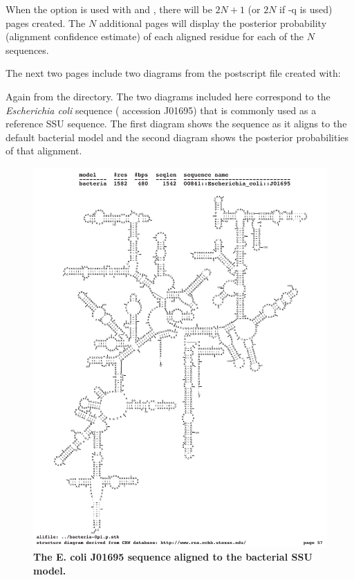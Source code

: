 When the  option is used with  and
, there will be $2N+1$ (or $2N$ if {\prog -q} is used)
pages created. The $N$ additional pages will display the posterior
probability (alignment confidence estimate) of each aligned residue
for each of the $N$ sequences.

The next two pages include two diagrams from the postscript file 
 created with:


Again from the  directory.
The two diagrams included here correspond to the
\emph{Escherichia coli} sequence ( accession J01695) that
is commonly used as a reference SSU sequence. The first diagram shows
the sequence as it aligns to the default bacterial model and the
second diagram shows the posterior probabilities of that alignment.

\begin{figure}
\begin{center}
\includegraphics[width=5.7in]{Figures/ecoli-seq}
\end{center}
\caption{\textbf{The E. coli J01695 sequence aligned to the bacterial
SSU model.}}
\label{fig:ecoli-seq}
\end{figure}

